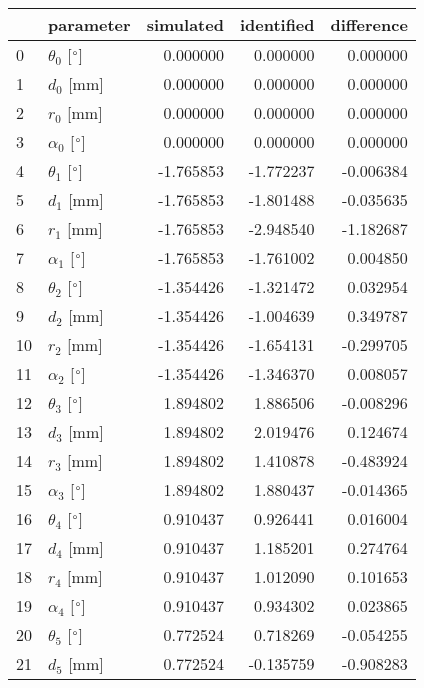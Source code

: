\documentclass{standalone}%
\begin{document}
%
\normalsize%
\begin{tabular}{llrrr}
\toprule
{} &                 parameter & simulated & identified & difference \\
\midrule
0  &  $\theta_{0}$ [$\degree$] &  0.000000 &   0.000000 &   0.000000 \\
1  &              $d_{0}$ [mm] &  0.000000 &   0.000000 &   0.000000 \\
2  &              $r_{0}$ [mm] &  0.000000 &   0.000000 &   0.000000 \\
3  &  $\alpha_{0}$ [$\degree$] &  0.000000 &   0.000000 &   0.000000 \\
4  &  $\theta_{1}$ [$\degree$] & -1.765853 &  -1.772237 &  -0.006384 \\
5  &              $d_{1}$ [mm] & -1.765853 &  -1.801488 &  -0.035635 \\
6  &              $r_{1}$ [mm] & -1.765853 &  -2.948540 &  -1.182687 \\
7  &  $\alpha_{1}$ [$\degree$] & -1.765853 &  -1.761002 &   0.004850 \\
8  &  $\theta_{2}$ [$\degree$] & -1.354426 &  -1.321472 &   0.032954 \\
9  &              $d_{2}$ [mm] & -1.354426 &  -1.004639 &   0.349787 \\
10 &              $r_{2}$ [mm] & -1.354426 &  -1.654131 &  -0.299705 \\
11 &  $\alpha_{2}$ [$\degree$] & -1.354426 &  -1.346370 &   0.008057 \\
12 &  $\theta_{3}$ [$\degree$] &  1.894802 &   1.886506 &  -0.008296 \\
13 &              $d_{3}$ [mm] &  1.894802 &   2.019476 &   0.124674 \\
14 &              $r_{3}$ [mm] &  1.894802 &   1.410878 &  -0.483924 \\
15 &  $\alpha_{3}$ [$\degree$] &  1.894802 &   1.880437 &  -0.014365 \\
16 &  $\theta_{4}$ [$\degree$] &  0.910437 &   0.926441 &   0.016004 \\
17 &              $d_{4}$ [mm] &  0.910437 &   1.185201 &   0.274764 \\
18 &              $r_{4}$ [mm] &  0.910437 &   1.012090 &   0.101653 \\
19 &  $\alpha_{4}$ [$\degree$] &  0.910437 &   0.934302 &   0.023865 \\
20 &  $\theta_{5}$ [$\degree$] &  0.772524 &   0.718269 &  -0.054255 \\
21 &              $d_{5}$ [mm] &  0.772524 &  -0.135759 &  -0.908283 \\

\end{tabular}
\end{document}
